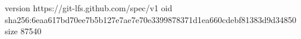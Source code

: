 version https://git-lfs.github.com/spec/v1
oid sha256:6eaa617bd70ee7b5b127e7ae7e70e3399878371d1ea660cdebf81383d9d34850
size 87540
